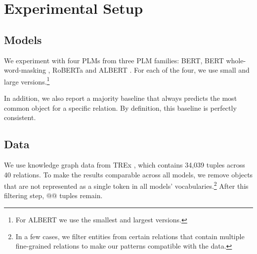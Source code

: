 \section{Experimental Setup}
\label{sec:setup}

\subsection{Models}
We experiment with four PLMs
from three PLM families: BERT, BERT whole-word-masking
\cite{bert}, RoBERTa \cite{roberta} and ALBERT
\cite{albert}. For each of the four, we use small and large versions.\footnote{For ALBERT we use the smallest and largest versions.}


In addition, we also report a majority baseline that always predicts the most common object for a specific relation. By definition, this baseline is perfectly consistent.

\subsection{Data}



We use knowledge graph data from TREx \cite{trex}, which
contains 34,039 tuples across 40 relations. To make the
results comparable across all models, we remove objects that
are not represented as a single token in all models'
vocabularies.\footnote{In a few cases, we filter entities from certain relations that contain multiple fine-grained relations to make our patterns compatible with the data.}
After this filtering step, @@ tuples remain.

